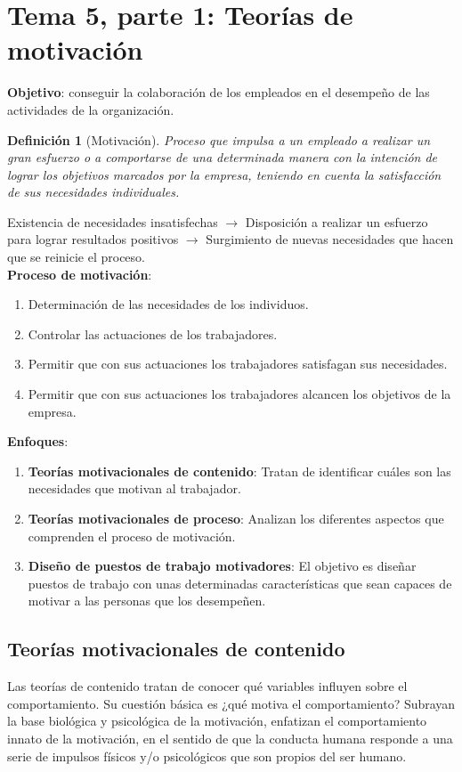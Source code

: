 \documentclass[12pt]{article}
\theoremstyle{definition_wo_parentheses}
\newtheorem{definicion}{Definición}[section]
\begin{document}
\section{Tema 5, parte 1: Teorías de motivación}
\textbf{Objetivo}: conseguir la colaboración de los empleados en el desempeño de las actividades de la organización.
\begin{definicion}[Motivación]
	Proceso que impulsa a un empleado a realizar un gran esfuerzo o a comportarse de una determinada manera con la intención de lograr los objetivos marcados por la empresa, teniendo en cuenta la satisfacción de sus necesidades individuales.
\end{definicion}

Existencia de necesidades insatisfechas $\rightarrow$ Disposición a realizar un esfuerzo para lograr resultados positivos $\rightarrow$ Surgimiento de nuevas necesidades que hacen que se reinicie el proceso.\\

\textbf{Proceso de motivación}:
\begin{enumerate}
\item Determinación de las necesidades de los individuos.
\item Controlar las actuaciones de los trabajadores.
\item Permitir que con sus actuaciones los trabajadores satisfagan sus necesidades.
\item Permitir que con sus actuaciones los trabajadores alcancen los objetivos de la empresa.
\end{enumerate}


\textbf{Enfoques}:
\begin{enumerate}
\item \textbf{Teorías motivacionales de contenido}: Tratan de identificar cuáles son las necesidades que motivan al trabajador.
\item \textbf{Teorías motivacionales de proceso}: Analizan los diferentes aspectos que comprenden el proceso de motivación.
\item \textbf{Diseño de puestos de trabajo motivadores}: El objetivo es diseñar puestos de trabajo con unas determinadas características que sean capaces de motivar a las personas que los desempeñen.
\end{enumerate}

\subsection{Teorías motivacionales de contenido}
Las teorías de contenido tratan de conocer qué variables influyen sobre el comportamiento. Su cuestión básica es ¿qué motiva el comportamiento? Subrayan la base biológica y psicológica de la motivación, enfatizan el comportamiento innato de la motivación, en el sentido de que la conducta humana responde a una serie de impulsos físicos y/o psicológicos que son propios del ser humano.\\
\end{document}
